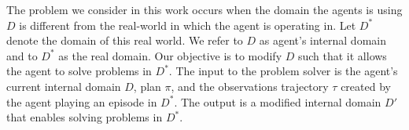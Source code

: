 \documentclass[letterpaper]{article} %
\newcommand{\tuple}[1]{\ensuremath{\left \langle #1 \right \rangle }} %
\newcommand{\hydra}{\textsc{Hydra}\xspace} %
\newtheorem{definition}{Definition} %
\begin{document}
The problem we consider in this work occurs when the domain the agents is using $D$ is different from the real-world in which the agent is operating in. Let $D^*$ denote the domain of this real world. We refer to $D$ as agent's internal domain and to $D^*$ as the real domain. Our objective is to modify $D$ such that it allows the agent to solve problems in $D^*$. 
The input to the problem solver is the agent's current internal domain $D$, plan $\pi$, and the observations trajectory $\tau$ created by the agent playing an episode in $D^*$. 
The output is a modified internal domain $D'$ that enables solving problems in $D^*$. 







\end{document}

